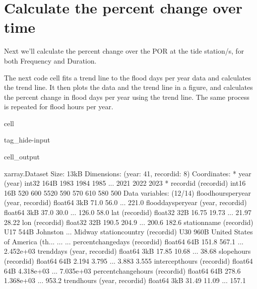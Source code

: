 \documentclass[letterpaper,10pt,english]{jupyterBook}
\begin{document}
\chapter{Calculate the percent change over time}
\label{\detokenize{notebooks/FloodFrequency:calculate-the-percent-change-over-time}}
\sphinxAtStartPar
Next we’ll calculate the percent change over the POR at the tide station/s, for both Frequency and Duration.

\sphinxAtStartPar
The next code cell fits a trend line to the flood days per year data and calculates the trend line.
It then plots the data and the trend line in a figure, and calculates the percent change in flood days per year using the trend line. The same process is repeated for flood hours per year.

\begin{sphinxuseclass}{cell}
\begin{sphinxuseclass}{tag_hide-input}\begin{sphinxVerbatimOutput}

\begin{sphinxuseclass}{cell_output}
\begin{sphinxVerbatim}[commandchars=\\\{\}]
\PYGZlt{}xarray.Dataset\PYGZgt{} Size: 13kB
Dimensions:               (year: 41, record\PYGZus{}id: 8)
Coordinates:
  * year                  (year) int32 164B 1983 1984 1985 ... 2021 2022 2023
  * record\PYGZus{}id             (record\PYGZus{}id) int16 16B 520 600 5520 590 570 610 580 500
Data variables: (12/14)
    flood\PYGZus{}hours\PYGZus{}per\PYGZus{}year  (year, record\PYGZus{}id) float64 3kB 71.0 56.0 ... 221.0
    flood\PYGZus{}days\PYGZus{}per\PYGZus{}year   (year, record\PYGZus{}id) float64 3kB 37.0 30.0 ... 126.0 58.0
    lat                   (record\PYGZus{}id) float32 32B 16.75 19.73 ... 21.97 28.22
    lon                   (record\PYGZus{}id) float32 32B 190.5 204.9 ... 200.6 182.6
    station\PYGZus{}name          (record\PYGZus{}id) \PYGZlt{}U17 544B \PYGZsq{}Johnston\PYGZsq{} ... \PYGZsq{}Midway\PYGZsq{}
    station\PYGZus{}country       (record\PYGZus{}id) \PYGZlt{}U30 960B \PYGZsq{}United States of America (th...
    ...                    ...
    percent\PYGZus{}change\PYGZus{}days   (record\PYGZus{}id) float64 64B 151.8 567.1 ... 2.452e+03
    trend\PYGZus{}days            (year, record\PYGZus{}id) float64 3kB 17.85 10.68 ... 38.68
    slope\PYGZus{}hours           (record\PYGZus{}id) float64 64B 2.194 3.795 ... 3.883 3.555
    intercept\PYGZus{}hours       (record\PYGZus{}id) float64 64B \PYGZhy{}4.318e+03 ... \PYGZhy{}7.035e+03
    percent\PYGZus{}change\PYGZus{}hours  (record\PYGZus{}id) float64 64B 278.6 1.368e+03 ... 953.2
    trend\PYGZus{}hours           (year, record\PYGZus{}id) float64 3kB 31.49 11.09 ... 157.1
\end{sphinxVerbatim}

\end{sphinxuseclass}\end{sphinxVerbatimOutput}

\end{sphinxuseclass}
\end{sphinxuseclass}
\end{document}
